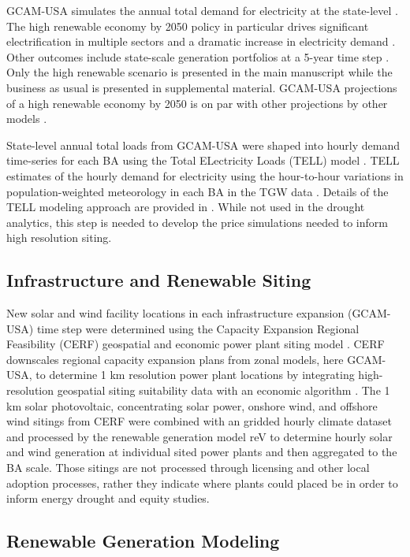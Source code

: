 \documentclass{agujournal2019}
\begin{document}
GCAM-USA simulates the annual total demand for electricity at the state-level \cite{Khan_2021,Binsted2022}. The high renewable economy by 2050 policy in particular drives significant electrification in multiple sectors and a dramatic increase in electricity demand \cite{Ou2023}. Other outcomes include state-scale generation portfolios at a 5-year time step \cite{Ou2023}. Only the high renewable scenario is presented in the main manuscript while the business as usual is presented in supplemental material. GCAM-USA projections of a high renewable economy by 2050 is on par with other projections by other models \cite{Browning_2023}.  

State-level annual total loads from GCAM-USA were shaped into hourly demand time-series for each BA using the Total ELectricity Loads (TELL) model \cite{McGrath2022}. TELL estimates of the hourly demand for electricity using the hour-to-hour variations in population-weighted meteorology in each BA in the TGW data \cite{Burleyson2023}. Details of the TELL modeling approach are provided in \cite{Burleyson2024}. While not used in the drought analytics, this step is needed to develop the price simulations needed to inform high resolution siting.  

\subsection{Infrastructure and Renewable Siting}
New solar and wind facility locations in each infrastructure expansion (GCAM-USA) time step were determined using the Capacity Expansion Regional Feasibility (CERF) geospatial and economic power plant siting model \cite{Vernon_2021}. CERF downscales regional capacity expansion plans from zonal models, here GCAM-USA, to determine 1 km resolution power plant locations by integrating high-resolution geospatial siting suitability data with an economic algorithm \cite{Vernon_2023,Mongird_2024}. The 1 km solar photovoltaic, concentrating solar power, onshore wind, and offshore wind sitings from CERF were combined with an gridded hourly climate dataset and processed by the renewable generation model reV to determine hourly solar and wind generation at individual sited power plants and then aggregated to the BA scale. Those sitings are not processed through licensing and other local adoption processes, rather they indicate where plants could placed be in order to inform energy drought and equity studies. 

\subsection{Renewable Generation Modeling}
\end{document}
